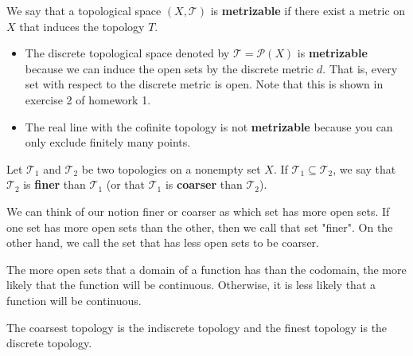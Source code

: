 \begin{definition}
    We say that a topological space \( (X,\mathcal{T}) \) is \textbf{metrizable} if there exist a metric on \( X  \) that induces the topology \( T  \).
\end{definition}

\begin{eg}
    \begin{itemize}
    \item The discrete topological space denoted by \( \mathcal{T} = \mathcal{P}(X) \) is \textbf{metrizable} because we can induce the open sets by the discrete metric \( d  \). That is, every set with respect to the discrete metric is open. Note that this is shown in exercise 2 of homework 1.
    \item The real line with the cofinite topology is not \textbf{metrizable} because you can only exclude finitely many points.  
    \end{itemize}
\end{eg}

\begin{definition}
   Let \( {\mathcal{T}}_{1} \) and \( \mathcal{T}_2 \) be two topologies on a nonempty set \( X  \). If \( {\mathcal{T}}_{1} \subseteq {\mathcal{T}}_{2} \), we say that \( \mathcal{T}_2 \) is \textbf{finer} than \( \mathcal{T}_1 \) (or that \( {\mathcal{T}}_{1}  \) is \textbf{coarser} than \( {\mathcal{T}}_{2} \)).
\end{definition}

\begin{remark}
   We can think of our notion finer or coarser as which set has more open sets. If one set has more open sets than the other, then we call that set "finer". On the other hand, we call the set that has less open sets to be coarser.  
\end{remark}


\begin{remark}
   The more open sets that a domain of a function has than the codomain, the more likely that the function will be continuous. Otherwise, it is less likely that a function will be continuous.
\end{remark}

\begin{eg}
    The coarsest topology is the indiscrete topology and the finest topology is the discrete topology.
\end{eg}


